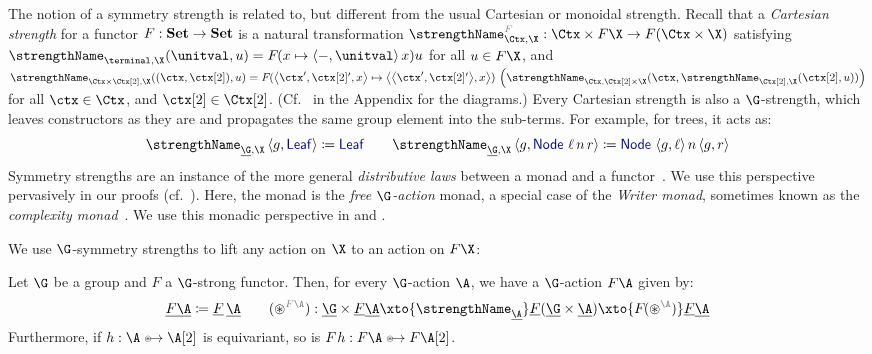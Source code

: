\begin{remark}
  The notion of a symmetry strength is related to, but different from the
  usual Cartesian or monoidal strength. Recall that a \emph{Cartesian
  strength} for a functor $F : {\mathbf{ Set}} \to {\mathbf{ Set}}$ is a natural
  transformation
  \(
    \strength[F]_{\Ctx, \X}  : \Ctx \times F\X \to F(\Ctx \times \X)
  \)
  satisfying
  \(
    \strength_{\terminal,
      \X}(\unitval, u) = \fmap(\fun x\pair-{\unitval}x)u
  \)
  for all $u \in F\X$, and
  \(
    \strength_{\Ctx\times\Dtx, \X}((\ctx, \dtx), u) =
    \fmap(\fun{\triple {\ctx'}{\dtx'}x}\pair{\pair {\ctx'}{\dtx'}}x)
    \,\parent{\strength_{\Ctx, \Dtx\times\X}(
    \ctx, \strength_{\Dtx, \X}(\dtx, u))}
    \) for all $\ctx \in \Ctx$, and $\dtx \in \Dtx$.
    (Cf.~ in the Appendix
    for the diagrams.)
  Every Cartesian strength is also a $\G$-strength, which leaves
  constructors as they are and propagates the same group element into
  the sub-terms. For example, for trees, it acts as:
  \[
    \strength_{\carrier\G, \X} \pair g \Leaf \definedby \Leaf
    \qquad
    \strength_{\carrier\G, \X} \pair g {\Node\,\ell\,n\,r}
    \definedby \Node\,{\pair g\ell}\,n\,{\pair g r}
  \]
  Symmetry strengths are an instance of the more general
  \emph{distributive laws} between a
  monad and a functor~\cite{beck:distributive-laws}. We use this
  perspective pervasively in our proofs (cf.~). Here, the monad is the \emph{free $\G$-action} monad, a
  special case of the \emph{Writer monad}, sometimes known as the \emph{complexity
    monad}~\cite{cenciarelli-moggi:a-syntactic-approach-to-modularity-in-denotational-semantics}.
  We use this monadic perspective in  and
  .
\end{remark}

We use $\G$-symmetry strengths to lift any action on $\X$ to an action
on $F\X$:
\begin{lemma}
  Let $\G$ be a group and $F$ a $\G$-strong functor. Then, for every
  $\G$-action $\A$, we have a $\G$-action $F\A$ given by:
  \[
  \carrier{F\A} \definedby \carrier F\,\carrier\A
  \qquad\smash{
    (\act[{F\A}]) : \carrier\G \times \carrier F\carrier\A \xto{\gstrength_{\carrier\A}}
    \carrier F(\carrier\G \times \carrier\A) \xto{\fmap (\act[\A])} \carrier F\carrier\A}
  \]
  Furthermore, if $h : \A \equito \B$ is equivariant, so is $\fmap h : F \A \equito F \B$.
\end{lemma}

